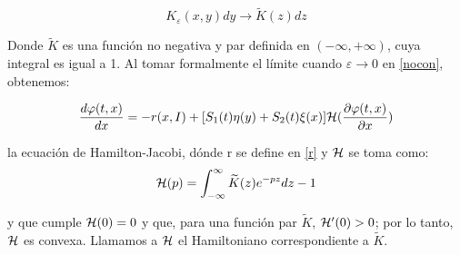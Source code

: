 \begin{equation*}
	K_{\varepsilon}(x,y)dy\longrightarrow \widetilde{K}(z)dz
\end{equation*}

Donde $\widetilde{K}$ es una función no negativa y par definida en $(-\infty,+\infty)$, cuya integral es igual a 1. Al tomar formalmente el límite cuando $\varepsilon\to 0$ en \eqref{nocon}, obtenemos:

\begin{equation}\label{hj}
	\frac{d\varphi(t,x) }{dx}=-r(x,I)+[S_1(t)\eta(y)+S_2(t)\xi(x)]\mathcal{H}(\frac{\partial \varphi(t,x) }{\partial x})
\end{equation}

la ecuación de Hamilton-Jacobi, dónde r se define en \eqref{r} y $\mathcal{H}$ se toma como:
\begin{equation*}
	\mathcal{H}(p)=\int_{-\infty}^{\infty}\widetilde{K}(z)e^{-pz}dz-1
\end{equation*}

y que cumple $\mathcal{H}(0)=0$ y que, para una función par $\widetilde{K}$, $\mathcal{H}'(0)>0$; por lo tanto, $\mathcal{H}$ es convexa. Llamamos a $\mathcal{H}$ el Hamiltoniano correspondiente a $\widetilde{K}$.

